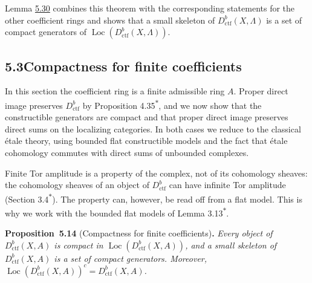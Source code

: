 \documentclass[11pt]{article}
\newenvironment{bpstatement}[2]{\par\addvspace{0.6\baselineskip}\noindent\textbf{#1}#2\textbf{.}\enspace\ignorespaces}
  {\par\addvspace{0.4\baselineskip}}
\newenvironment{bpstatementit}[2]{\begin{bpstatement}{#1}{#2}\itshape\ignorespaces}{\end{bpstatement}}
\newcommand{\bpout}[1]{#1\textsuperscript{\hyperlink{bp-outside}{\ensuremath{\ast}}}}
\providecommand{\Loc}{}\renewcommand{\Loc}{\operatorname{Loc}}
\begin{document}
\label{bp42}%
Lemma \hyperref[bp97]{5.30} combines this theorem with the corresponding statements for the other coefficient rings and shows that a small skeleton of \(D^b_{\mathrm{ctf}}(X,\Lambda)\) is a set of compact generators of \(\Loc(D^b_{\mathrm{ctf}}(X,\Lambda))\).



\subsection*{\texorpdfstring{5.3\quad Compactness for finite coefficients}{5.3 Compactness for finite coefficients}}
\label{bp43}%
\label{bp44}%
In this section the coefficient ring is a finite admissible ring \(A\). Proper direct image preserves \(D^b_{\mathrm{ctf}}\) by Proposition \bpout{4.35}, and we now show that the constructible generators are compact and that proper direct image preserves direct sums on the localizing categories. In both cases we reduce to the classical étale theory, using bounded flat constructible models and the fact that étale cohomology commutes with direct sums of unbounded complexes.

Finite Tor amplitude is a property of the complex, not of its cohomology sheaves: the cohomology sheaves of an object of \(D^b_{\mathrm{ctf}}\) can have infinite Tor amplitude (Section \bpout{3.4}). The property can, however, be read off from a flat model. This is why we work with the bounded flat models of Lemma \bpout{3.13}.

\label{bp45}%
\begin{bpstatementit}{Proposition~5.14}{ (Compactness for finite coefficients)}
Every object of \(D^b_{\mathrm{ctf}}(X,A)\) is compact in \(\Loc(D^b_{\mathrm{ctf}}(X,A))\), and a small skeleton of \(D^b_{\mathrm{ctf}}(X,A)\) is a set of compact generators. Moreover, \(\Loc(D^b_{\mathrm{ctf}}(X,A))^c=D^b_{\mathrm{ctf}}(X,A)\).
\end{bpstatementit}
\end{document}
